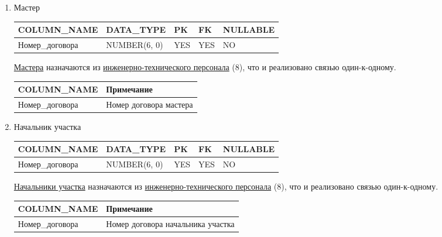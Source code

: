 \begin{enumerate}
\begin{tabular}{|p{4cm}|p{5cm}|}
    \end{tabular}

    \item{Мастер}

    \begin{tabular}{|p{4cm}|p{3cm}|p{1cm}|p{1cm}|p{2cm}|} \hline

        {\bf COLUMN\_NAME} & {\bf DATA\_TYPE} & {\bf PK} & {\bf FK} & {\bf NULLABLE} \\ \hline
        Номер\_договора & NUMBER(6, 0) & YES & YES & NO \\ \hline

    \end{tabular}

    \underline{Мастера} назначаются из \underline{инженерно-технического персонала} (8), что и реализовано связью один-к-одному.

    \begin{tabular}{|p{4cm}|p{5cm}|} \hline

        {\bf COLUMN\_NAME} & {\bf Примечание} \\ \hline
        Номер\_договора & Номер договора мастера \\ \hline

    \end{tabular}

    \item{Начальник участка}

    \begin{tabular}{|p{4cm}|p{3cm}|p{1cm}|p{1cm}|p{2cm}|} \hline

        {\bf COLUMN\_NAME} & {\bf DATA\_TYPE} & {\bf PK} & {\bf FK} & {\bf NULLABLE} \\ \hline
        Номер\_договора & NUMBER(6, 0) & YES & YES & NO \\ \hline

    \end{tabular}

    \underline{Начальники участка} назначаются из \underline{инженерно-технического персонала} (8), что и реализовано связью один-к-одному.

    \begin{tabular}{|p{4cm}|p{5cm}|} \hline

        {\bf COLUMN\_NAME} & {\bf Примечание} \\ \hline
        Номер\_договора & Номер договора начальника участка \\ \hline

    \end{tabular}


\end{enumerate}
